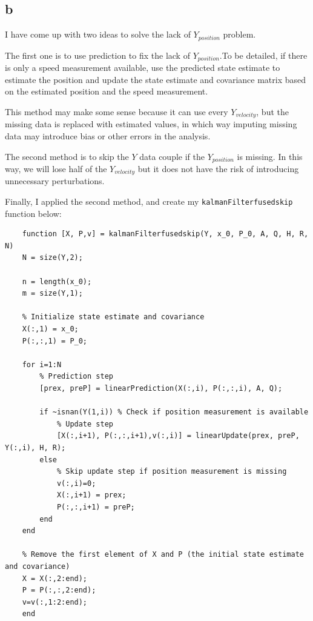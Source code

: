 \subsection{b}

I have come up with two ideas to solve the lack of $Y_{position} $ problem.

The first one is to use prediction to fix the lack of $ Y_{position} $.To be detailed, if there is only a speed measurement available, use the predicted state estimate to estimate the position and update the state estimate and covariance matrix based on the estimated position and the speed measurement.

This method may make some sense because it can use every $ Y_{velocity} $, but the missing data is replaced with estimated values, in which way imputing missing data may introduce bias or other errors in the analysis.

The second method is to skip the $ Y $ data couple if the $ Y_{position} $ is missing. In this way, we will lose half of the $ Y_{velocity} $ but it does not have the risk of introducing unnecessary perturbations.

Finally, I applied the second method, and create my \texttt{kalmanFilterfusedskip} function below:

\begin{lstlisting}
    function [X, P,v] = kalmanFilterfusedskip(Y, x_0, P_0, A, Q, H, R, N)
    N = size(Y,2);
    
    n = length(x_0);
    m = size(Y,1);
    
    % Initialize state estimate and covariance
    X(:,1) = x_0;
    P(:,:,1) = P_0;
    
    for i=1:N
        % Prediction step
        [prex, preP] = linearPrediction(X(:,i), P(:,:,i), A, Q);
    
        if ~isnan(Y(1,i)) % Check if position measurement is available
            % Update step
            [X(:,i+1), P(:,:,i+1),v(:,i)] = linearUpdate(prex, preP, Y(:,i), H, R);
        else
            % Skip update step if position measurement is missing
            v(:,i)=0;
            X(:,i+1) = prex;
            P(:,:,i+1) = preP;
        end
    end
    
    % Remove the first element of X and P (the initial state estimate and covariance)
    X = X(:,2:end);
    P = P(:,:,2:end);
    v=v(:,1:2:end);
    end
    
\end{lstlisting}

